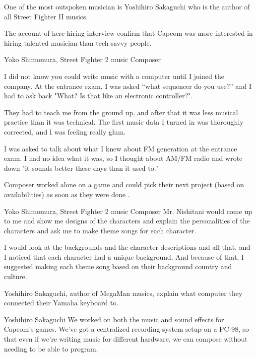 One of the most outspoken musician is Yoshihiro Sakaguchi who is the author of all Street Fighter II musics.

The account of here hiring interview confirm that Capcom was more interested in hiring talented musician than tech savvy people.

\begin{q}{Yoko Shimomura, Street Fighter 2 music Composer\cite{beep199010}}
  
I did not know you could write music with a computer until I joined the company. At the entrance exam, I was asked “what sequencer do you use?” and I had to ask back "What? Is that like an electronic controller?".

They had to teach me from the ground up, and after that it was less musical practice than it was technical. The first music data I turned in was thoroughly corrected, and I was feeling really glum.

I was asked to talk about what I knew about FM generation at the entrance exam. I had no idea what it was, so I thought about AM/FM radio and wrote down "it sounds better these days than it used to."
\end{q}



Composer worked alone on a game and could pick their next project (based on availabilities\cite{sf2musics}) as soon as they were done .

\begin{q}{Yoko Shimomura, Street Fighter 2 music Composer\cite{sf2_oral_history}}
Mr. Nishitani would come up to me and show me designs of the characters and explain the personalities of the characters and ask me to make theme songs for each character.

I would look at the backgrounds and the character descriptions and all that, and I noticed that each character had a unique background. And because of that, I suggested making each theme song based on their background country and culture.
\end{q}


Yoshihiro Sakaguchi, author of MegaMan musics, explain what computer they connected their Yamaha keyboard to.

\begin{q}{Yoshihiro Sakaguchi\cite{yoko_shimomura_interview}  }
We worked on both the music and sound effects for Capcom’s games. We’ve got a centralized recording system setup on a PC-98, so that even if we’re writing music for different hardware, we can compose without needing to be able to program.
\end{q}


